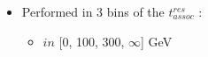 {{        \small        
        \begin{itemize}
          \footnotesize
        \item Performed in 3 bins of the $t^{res}_{assoc}$ \pT:
          \begin{itemize}
            \footnotesize
          \item \pT $in$ [0, 100, 300, $\infty$] GeV \FixmeTag
          \end{itemize}          
        \end{itemize}        
      }
      {

        \vspace{-1.6cm}
        
      }

}
